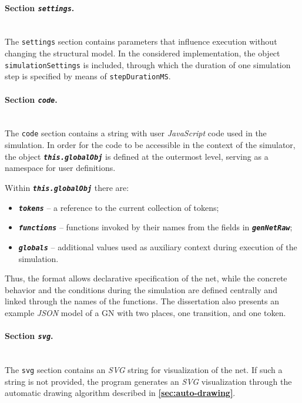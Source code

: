 	\paragraph{Section \textit{\texttt{settings}}.}\mbox{}\\
	The \texttt{settings} section contains parameters that influence execution without changing the structural model. In the considered implementation, the object \texttt{simulationSettings} is included, through which the duration of one simulation step is specified by means of \texttt{stepDurationMS}.
	
	\paragraph{Section \textit{\texttt{code}}.}\mbox{}\\
	The \texttt{code} section contains a string with user \textit{JavaScript} code used in the simulation. In order for the code to be accessible in the context of the simulator, the object \texttt{\textbf{\textit{this.globalObj}}} is defined at the outermost level, serving as a namespace for user definitions.
	
	\hspace*{2.5em}Within \texttt{\textbf{\textit{this.globalObj}}} there are:
	\begin{itemize}
		\item \texttt{\textbf{\textit{tokens}}} -- a reference to the current collection of tokens;
		\item \texttt{\textbf{\textit{functions}}} -- functions invoked by their names from the fields in \texttt{\textbf{\textit{genNetRaw}}};
		\item \texttt{\textbf{\textit{globals}}} -- additional values used as auxiliary context during execution of the simulation.
	\end{itemize}
	
	Thus, the format allows declarative specification of the net, while the concrete behavior and the conditions during the simulation are defined centrally and linked through the names of the functions. The dissertation also presents an example \textit{JSON} model of a GN with two places, one transition, and one token.
	
	\paragraph{Section \textit{\texttt{svg}}.}\mbox{}\\
	The \texttt{svg} section contains an \textit{SVG} string for visualization of the net. If such a string is not provided, the program generates an \textit{SVG} visualization through the automatic drawing algorithm described in \textbf{\ref{sec:auto-drawing}}.
	
